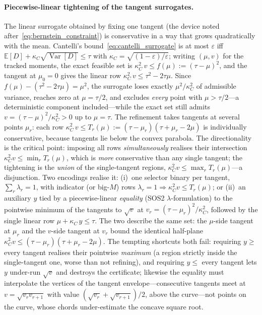 \documentclass[11pt,a4paper]{article}
\theoremstyle{plain}
\theoremstyle{definition}
\theoremstyle{remark}
\begin{document}
\paragraph{Piecewise-linear tightening of the tangent surrogates.}
The linear surrogate obtained by fixing one tangent (the device noted after~\eqref{eq:bernstein_constraint}) is conservative in a way that grows quadratically with the mean.
Cantelli's bound~\eqref{eq:cantelli_surrogate} is at most $\varepsilon$ iff $\mathbb{E}[D] + \kappa_C\sqrt{\operatorname{Var}[D]} \le \tau$ with $\kappa_C = \sqrt{(1-\varepsilon)/\varepsilon}$; writing $(\mu, v)$ for the tracked moments, the exact feasible set is $\kappa_C^2\, v \le f(\mu) := (\tau - \mu)^2$, and the tangent at $\mu_0 = 0$ gives the linear row $\kappa_C^2\, v \le \tau^2 - 2\tau\mu$.
Since $f(\mu) - (\tau^2 - 2\tau\mu) = \mu^2$, the surrogate loses exactly $\mu^2/\kappa_C^2$ of admissible variance, reaches zero at $\mu = \tau/2$, and excludes \emph{every} point with $\mu > \tau/2$---a deterministic component included---while the exact set still admits $v = (\tau - \mu)^2/\kappa_C^2 > 0$ up to $\mu = \tau$.
The refinement takes tangents at several points $\mu_r$: each row $\kappa_C^2\, v \le T_r(\mu) := (\tau - \mu_r)(\tau + \mu_r - 2\mu)$ is individually conservative, because tangents lie below the convex parabola.
The directionality is the critical point: imposing all rows \emph{simultaneously} realises their intersection $\kappa_C^2 v \le \min_r T_r(\mu)$, which is \emph{more} conservative than any single tangent; the tightening is the \emph{union} of the single-tangent regions, $\kappa_C^2 v \le \max_r T_r(\mu)$---a disjunction.
Two encodings realise it: (i)~one selector binary per tangent, $\sum_r \lambda_r = 1$, with indicator (or big-$M$) rows $\lambda_r = 1 \Rightarrow \kappa_C^2 v \le T_r(\mu)$; or (ii)~an auxiliary $y$ tied by a piecewise-linear \emph{equality} (SOS2 $\lambda$-formulation) to the pointwise minimum of the tangents to $\sqrt{v}$ at $v_r = (\tau - \mu_r)^2/\kappa_C^2$, followed by the single linear row $\mu + \kappa_C\, y \le \tau$.
The two describe the same set: the $\mu$-side tangent at $\mu_r$ and the $v$-side tangent at $v_r$ bound the identical half-plane $\kappa_C^2 v \le (\tau - \mu_r)(\tau + \mu_r - 2\mu)$.
The tempting shortcuts both fail: requiring $y \ge$ every tangent realises their pointwise \emph{maximum} (a region strictly inside the single-tangent one, worse than not refining), and requiring $y \le$ every tangent lets $y$ under-run $\sqrt{v}$ and destroys the certificate; likewise the equality must interpolate the vertices of the tangent envelope---consecutive tangents meet at $v = \sqrt{v_r v_{r+1}}$ with value $(\sqrt{v_r} + \sqrt{v_{r+1}})/2$, above the curve---not points on the curve, whose chords under-estimate the concave square root.
\end{document}

